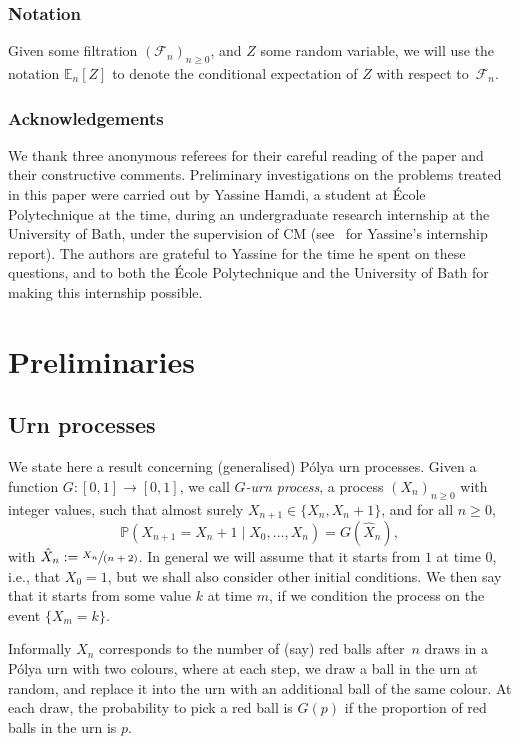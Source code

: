 \documentclass[11pt]{article}
\newcommand{\ie}{i.e.,\xspace}
\let\mathcal\mathscr
\newcommand{\spfrac}[2]{\sfrac{#1}{(#2)}}
\numberwithin{equation}{section}
\theoremstyle{definition}
\begin{document}
\subsubsection*{Notation} Given some filtration $(\mathcal F_n)_{n\ge 0}$, and $Z$ some random variable, we will use the notation $\mathbb E_n[Z]$ to denote the conditional expectation of $Z$ with respect to~$\mathcal F_n$.

\subsubsection*{Acknowledgements}
We thank three anonymous referees for their careful reading of the paper and their constructive comments.
Preliminary investigations on the problems treated in this paper were carried out by Yassine Hamdi,
a student at École Polytechnique at the time,
during an undergraduate research internship at the University of Bath,
under the supervision of CM (see~\cite{Yassine} for Yassine's internship report).
The authors are grateful to Yassine for the time he spent on these questions,
and to both the École Polytechnique and the University of Bath for making this internship possible.

\section{Preliminaries}\label{sec.prelim}

\subsection{Urn processes}
We state here a result concerning (generalised) Pólya urn processes.
Given a function $G:[0,1]\to [0,1]$, we call \emph{$G$-urn process}, a process $(X_n)_{n\ge 0}$ with integer values, such that almost surely $X_{n+1}
\in \{X_n,X_n+1\}$, and for all $n\ge 0$,
\[
\mathbb P(X_{n+1} = X_n +1 \mid X_0,\dots,X_n) = G(\hat X_n),
\]
with $\hat X_n :=\spfrac{X_n}{n+2}$.
In general we will assume that it starts from $1$ at time $0$, \ie that $X_0=1$, but we shall also consider other initial condition{s}.
We then say that it starts from some value $k$ at time $m$, if we condition the process on the event $\{X_m=k\}$.

Informally $X_n$ corresponds
to the number of (say) red balls after~$n$ draws in a Pólya urn with two colours,
where at each step, we draw a ball in the urn at random, and replace it into the urn with an additional ball of the same colour. At each draw, the probability to pick a red ball is $G(p)$
if the proportion of red balls in the urn is $p$.
\end{document}

